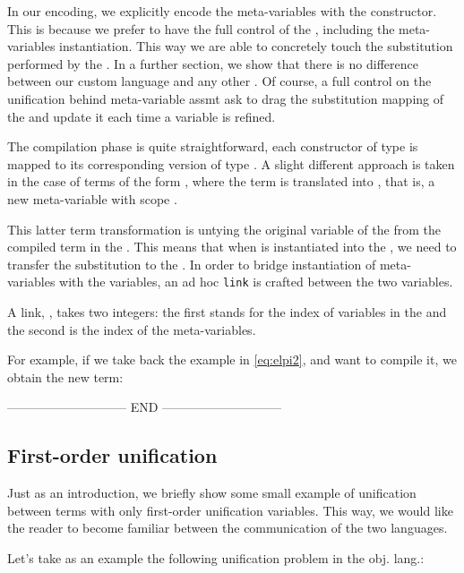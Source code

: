 \documentclass{rapport}
\begin{document}
In our encoding, we explicitly encode the meta-variables with the 
constructor. This is because we prefer to have the full control of the \ml,
including the meta-variables instantiation. This way we are able to concretely
touch the substitution performed by the \ml. In a further section, we show that
there is no difference between our custom \ml language and any other \ml. Of
course, a full control on the unification behind meta-variable assmt ask to
drag the substitution mapping of the \ml and update it each time a variable is
refined.

The compilation phase is quite straightforward, each constructor of type
 is mapped to its corresponding version of type . A
slight different approach is taken in the case of terms of the form , where the term is translated into , that is, a
new meta-variable  with scope .

This latter term transformation is untying the original variable  of
the \ol from the compiled term in the \ml. This means that when  is
instantiated into the \ml, we need to transfer the substitution to the \ol. In
order to bridge instantiation of meta-variables with the \ol variables, an ad
hoc \texttt{link} is crafted between the two variables.

A link, , takes two integers: the first 
stands for the index of variables in the \ol and the second is the index of 
the meta-variables.

For example, if we take back the example in \cref{eq:elpi2}, and want to compile
it, we obtain the new term:




----------------------------- END -----------------------------
\subsection{First-order unification}

Just as an introduction, we briefly show some small example of unification
between terms with only first-order unification variables. This way, we would
like the reader to become familiar between the communication of the two
languages.

Let's take as an example the following unification problem in the obj. lang.: 
\end{document}
